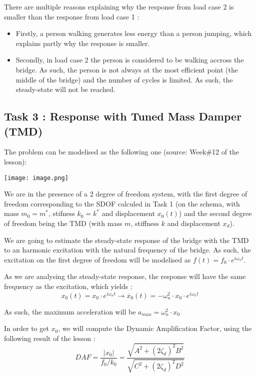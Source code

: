 There are multiple reasons explaining why the response from load case 2
is smaller than the response from load case 1 :

\begin{itemize}
\tightlist
\item
  Firstly, a person walking generates less energy than a person jumping,
  which explains partly why the response is smaller.
\item
  Secondly, in load case 2 the person is considered to be walking
  accross the bridge. As such, the person is not always at the most
  efficient point (the middle of the bridge) and the number of cycles is
  limited. As such, the steady-state will not be reached.
\end{itemize}

\hypertarget{task-3--response-with-tuned-mass-damper-tmd}{%
\subsection{Task 3 : Response with Tuned Mass Damper
(TMD)}\label{task-3--response-with-tuned-mass-damper-tmd}}

The problem can be modelised as the following one (source: Week\#12 of
the lesson):

\texttt{[image: image.png]}

We are in the presence of a 2 degree of freedom system, with the first
degree of freedom corresponding to the SDOF calculed in Task 1 (on the
schema, with mass \(m_0 = m^*\), stifness \(k_0 = k^*\) and displacement
\(x_0 (t)\)) and the second degree of freedom being the TMD (with mass
\(m\), stiffness \(k\) and displacement \(x_d\)).

We are going to estimate the steady-state response of the bridge with
the TMD to an harmonic excitation with the natural frequency of the
bridge. As such, the excitation on the first degree of freedom will be
modelised as \(f(t) = f_0 \cdot e^{i\omega_n t}\).

As we are analysing the steady-state response, the response will have
the same frequency as the excitation, which yields :
\[ x_0(t) = x_0  \cdot e^{i\omega_n t} \rightarrow \ddot{x_0}(t) = - \omega_n^2 \cdot x_0 \cdot e^{i\omega_n t} \]

As such, the maximum acceleration will be
\(a_{max} = \omega_n^2 \cdot x_0\)

In order to get \(x_0\), we will compute the Dynamic Amplification
Factor, using the following result of the lesson : \[
DAF = \frac{\left|x_0\right|}{f_0 / k_0}=\frac{\sqrt{A^2+\left(2 \zeta_d\right)^2 B^2}}{\sqrt{C^2+\left(2 \zeta_d\right)^2 D^2}}
\]


